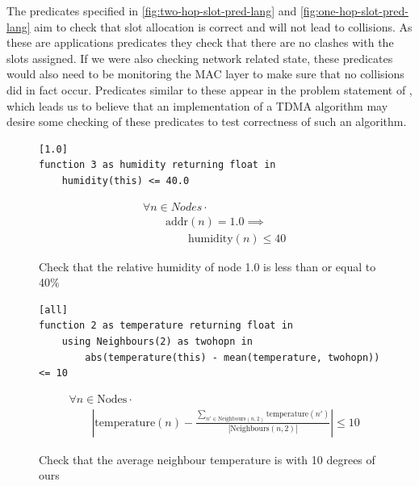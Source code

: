The predicates specified in \autoref{fig:two-hop-slot-pred-lang} and \autoref{fig:one-hop-slot-pred-lang} aim to check that slot allocation is correct and will not lead to collisions. As these are applications predicates they check that there are no clashes with the slots assigned. If we were also checking network related state, these predicates would also need to be monitoring the MAC layer to make sure that no collisions did in fact occur. Predicates similar to these appear in the problem statement of \cite{DBLP:journals/corr/abs-0808-0920}, which leads us to believe that an implementation of a TDMA algorithm may desire some checking of these predicates to test correctness of such an algorithm.

\begin{figure}[H]
\begin{minipage}{.5\linewidth}
\begin{lstlisting}[language=Hoppy]
[1.0]
function 3 as humidity returning float in
    humidity(this) <= 40.0
\end{lstlisting}
\end{minipage}%
\begin{minipage}{.5\linewidth}
\begin{align*}
&				\forall n \in Nodes \cdot \\
& \hspace{2em}		\text{addr}(n) = 1.0 \implies \\
& \hspace{4em}			\text{humidity}(n) \leq 40
\end{align*}
\end{minipage}
\caption{Check that the relative humidity of node 1.0 is less than or equal to 40\%}
\label{fig:app1-pred-lang}
\end{figure}

\begin{figure}[H]
\begin{minipage}{.5\linewidth}
\begin{lstlisting}[language=Hoppy]
[all]
function 2 as temperature returning float in
    using Neighbours(2) as twohopn in
        abs(temperature(this) - mean(temperature, twohopn)) <= 10
\end{lstlisting}
\end{minipage}

\begin{minipage}{.5\linewidth}
\begin{align*}
&				\forall n \in \text{Nodes} \cdot \\
& \hspace{2em}		\left|\text{temperature}(n) - \frac{\sum\limits_{n' \in \text{Neighbours}(n, 2)} \text{temperature}(n')}{|\text{Neighbours}(n, 2)|} \right| \leq 10
\end{align*}
\end{minipage}
\caption{Check that the average neighbour temperature is with 10 degrees of ours}
\label{fig:app2-pred-lang}
\end{figure}

